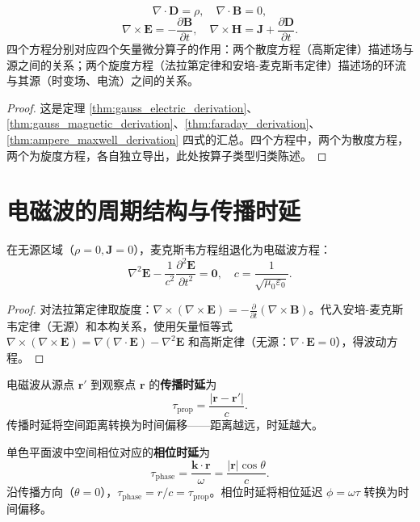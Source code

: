 \begin{theorem}\label{thm:maxwell_equations}
\[
\boxed{\nabla \cdot \mathbf{D} = \rho}, \quad \boxed{\nabla \cdot \mathbf{B} = 0},
\]
\[
\boxed{\nabla \times \mathbf{E} = -\frac{\partial \mathbf{B}}{\partial t}}, \quad \boxed{\nabla \times \mathbf{H} = \mathbf{J} + \frac{\partial \mathbf{D}}{\partial t}}.
\]
四个方程分别对应四个矢量微分算子的作用：两个散度方程（高斯定律）描述场与源之间的关系；两个旋度方程（法拉第定律和安培-麦克斯韦定律）描述场的环流与其源（时变场、电流）之间的关系。
\end{theorem}

\begin{proof}
这是定理 \ref{thm:gauss_electric_derivation}、\ref{thm:gauss_magnetic_derivation}、\ref{thm:faraday_derivation}、\ref{thm:ampere_maxwell_derivation} 四式的汇总。四个方程中，两个为散度方程，两个为旋度方程，各自独立导出，此处按算子类型归类陈述。
\end{proof}

\section{电磁波的周期结构与传播时延}

\begin{theorem}[电磁波方程]\label{thm:electromagnetic_wave_equation}
在无源区域（$\rho = 0, \mathbf{J} = 0$），麦克斯韦方程组退化为电磁波方程：
\[
\boxed{\nabla^2 \mathbf{E} - \frac{1}{c^2} \frac{\partial^2 \mathbf{E}}{\partial t^2} = \mathbf{0}}, \quad c = \frac{1}{\sqrt{\mu_0 \varepsilon_0}}.
\]
\end{theorem}

\begin{proof}
对法拉第定律取旋度：$\nabla\times(\nabla\times\mathbf{E}) = -\frac{\partial}{\partial t}(\nabla\times\mathbf{B})$。代入安培-麦克斯韦定律（无源）和本构关系，使用矢量恒等式 $\nabla\times(\nabla\times\mathbf{E}) = \nabla(\nabla\cdot\mathbf{E}) - \nabla^2\mathbf{E}$ 和高斯定律（无源：$\nabla\cdot\mathbf{E}=0$），得波动方程。
\end{proof}

\begin{definition}[传播时延]\label{def:propagation_delay}
电磁波从源点 $\mathbf{r}'$ 到观察点 $\mathbf{r}$ 的\textbf{传播时延}为
\[
\tau_{\text{prop}} = \frac{|\mathbf{r} - \mathbf{r}'|}{c}.
\]
传播时延将空间距离转换为时间偏移——距离越远，时延越大。
\end{definition}

\begin{definition}[相位时延]\label{def:phase_delay}
单色平面波中空间相位对应的\textbf{相位时延}为
\[
\tau_{\text{phase}} = \frac{\mathbf{k}\cdot\mathbf{r}}{\omega} = \frac{|\mathbf{r}|\cos\theta}{c}.
\]
沿传播方向（$\theta=0$），$\tau_{\text{phase}} = r/c = \tau_{\text{prop}}$。相位时延将相位延迟 $\phi = \omega\tau$ 转换为时间偏移。
\end{definition}

